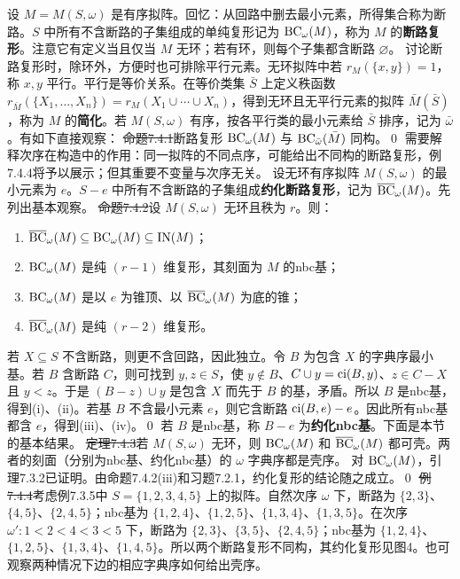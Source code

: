 设 $M=M(S,\omega)$ 是有序拟阵。回忆：从回路中删去最小元素，所得集合称为断路。$S$ 中所有不含断路的子集组成的单纯复形记为 $\operatorname{BC}_\omega(M)$，称为 $M$ 的\textbf{断路复形}。注意它有定义当且仅当 $M$ 无环；若有环，则每个子集都含断路 $\varnothing$。
讨论断路复形时，除环外，方便时也可排除平行元素。无环拟阵中若 $r_M(\{x,y\})=1$，称 $x,y$ 平行。平行是等价关系。在等价类集 $\bar S$ 上定义秩函数 $r_{\bar M}(\{X_1,\ldots,X_n\})=r_M(X_1\cup\cdots\cup X_n)$，得到无环且无平行元素的拟阵 $\bar M(\bar S)$，称为 $M$ 的\textbf{简化}。若 $M(S,\omega)$ 有序，按各平行类的最小元素给 $\bar S$ 排序，记为 $\bar\omega$。有如下直接观察：
\st{命题7.4.1}断路复形 $\operatorname{BC}_\omega(M)$ 与 $\operatorname{BC}_{\bar\omega}(\bar M)$ 同构。\qed
需要解释次序在构造中的作用：同一拟阵的不同点序，可能给出不同构的断路复形，例7.4.4将予以展示；但其重要不变量与次序无关。
设无环有序拟阵 $M(S,\omega)$ 的最小元素为 $e$。$S-e$ 中所有不含断路的子集组成\textbf{约化断路复形}，记为 $\overline{\operatorname{BC}}_\omega(M)$。先列出基本观察。
\st{命题7.4.2}设 $M(S,\omega)$ 无环且秩为 $r$。则：
\begin{enumerate}[label=(\roman*)]
\item $\overline{\operatorname{BC}}_\omega(M)\subseteq\operatorname{BC}_\omega(M)\subseteq\operatorname{IN}(M)$；
\item $\operatorname{BC}_\omega(M)$ 是纯 $(r-1)$ 维复形，其刻面为 $M$ 的nbc基；
\item $\operatorname{BC}_\omega(M)$ 是以 $e$ 为锥顶、以 $\overline{\operatorname{BC}}_\omega(M)$ 为底的锥；
\item $\overline{\operatorname{BC}}_\omega(M)$ 是纯 $(r-2)$ 维复形。
\end{enumerate}
\pr 若 $X\subseteq S$ 不含断路，则更不含回路，因此独立。令 $B$ 为包含 $X$ 的字典序最小基。若 $B$ 含断路 $C$，则可找到 $y,z\in S$，使 $y\notin B$、$C\cup y=\operatorname{ci}(B,y)$、$z\in C-X$ 且 $y<z$。于是 $(B-z)\cup y$ 是包含 $X$ 而先于 $B$ 的基，矛盾。所以 $B$ 是nbc基，得到(i)、(ii)。若基 $B$ 不含最小元素 $e$，则它含断路 $\operatorname{ci}(B,e)-e$。因此所有nbc基都含 $e$，得到(iii)、(iv)。\qed
若 $B$ 是nbc基，称 $B-e$ 为\textbf{约化nbc基}。下面是本节的基本结果。
\st{定理7.4.3}若 $M(S,\omega)$ 无环，则 $\operatorname{BC}_\omega(M)$ 和 $\overline{\operatorname{BC}}_\omega(M)$ 都可壳。两者的刻面（分别为nbc基、约化nbc基）的 $\omega$ 字典序都是壳序。
\pr 对 $\operatorname{BC}_\omega(M)$，引理7.3.2已证明。由命题7.4.2(iii)和习题7.2.1，约化复形的结论随之成立。\qed
\st{例7.4.4}考虑例7.3.5中 $S=\{1,2,3,4,5\}$ 上的拟阵。自然次序 $\omega$ 下，断路为 $\{2,3\}$、$\{4,5\}$、$\{2,4,5\}$；nbc基为 $\{1,2,4\}$、$\{1,2,5\}$、$\{1,3,4\}$、$\{1,3,5\}$。在次序 $\omega':1<2<4<3<5$ 下，断路为 $\{2,3\}$、$\{3,5\}$、$\{2,4,5\}$；nbc基为 $\{1,2,4\}$、$\{1,2,5\}$、$\{1,3,4\}$、$\{1,4,5\}$。所以两个断路复形不同构，其约化复形见图4。也可观察两种情况下边的相应字典序如何给出壳序。
